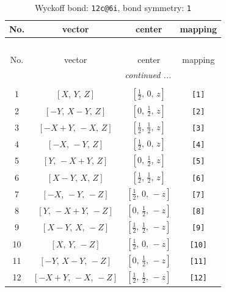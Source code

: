 \documentclass[fleqn,8pt]{jsarticle}
\begin{document}
\begin{longtable}{cccc}
\caption{Wyckoff bond: {\tt 12c@6i}, bond symmetry: {\tt 1}}
 \\
 \hline \hline
No. & vector & center & mapping \\ \hline \endfirsthead

\multicolumn{3}{l}{\tablename\ \thetable{}} \\
 \hline \hline
No. & vector & center & mapping \\ \hline \endhead

 \hline \hline
\multicolumn{3}{r}{\footnotesize\it continued ...} \\ \endfoot

 \hline \hline
\multicolumn{3}{r}{} \\ \endlastfoot

1 & $\left[ X,\, Y,\, Z \right]$ & $\left[ \frac{1}{2},\, 0,\, z \right]$ & {\tt [1]} \\ \hline
2 & $\left[ - Y,\, X - Y,\, Z \right]$ & $\left[ 0,\, \frac{1}{2},\, z \right]$ & {\tt [2]} \\ \hline
3 & $\left[ - X + Y,\, - X,\, Z \right]$ & $\left[ \frac{1}{2},\, \frac{1}{2},\, z \right]$ & {\tt [3]} \\ \hline
4 & $\left[ - X,\, - Y,\, Z \right]$ & $\left[ \frac{1}{2},\, 0,\, z \right]$ & {\tt [4]} \\ \hline
5 & $\left[ Y,\, - X + Y,\, Z \right]$ & $\left[ 0,\, \frac{1}{2},\, z \right]$ & {\tt [5]} \\ \hline
6 & $\left[ X - Y,\, X,\, Z \right]$ & $\left[ \frac{1}{2},\, \frac{1}{2},\, z \right]$ & {\tt [6]} \\ \hline
7 & $\left[ - X,\, - Y,\, - Z \right]$ & $\left[ \frac{1}{2},\, 0,\, - z \right]$ & {\tt [7]} \\ \hline
8 & $\left[ Y,\, - X + Y,\, - Z \right]$ & $\left[ 0,\, \frac{1}{2},\, - z \right]$ & {\tt [8]} \\ \hline
9 & $\left[ X - Y,\, X,\, - Z \right]$ & $\left[ \frac{1}{2},\, \frac{1}{2},\, - z \right]$ & {\tt [9]} \\ \hline
10 & $\left[ X,\, Y,\, - Z \right]$ & $\left[ \frac{1}{2},\, 0,\, - z \right]$ & {\tt [10]} \\ \hline
11 & $\left[ - Y,\, X - Y,\, - Z \right]$ & $\left[ 0,\, \frac{1}{2},\, - z \right]$ & {\tt [11]} \\ \hline
12 & $\left[ - X + Y,\, - X,\, - Z \right]$ & $\left[ \frac{1}{2},\, \frac{1}{2},\, - z \right]$ & {\tt [12]} \\
\end{longtable}
\end{document}
